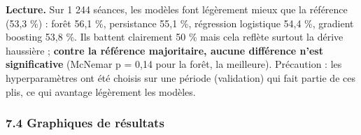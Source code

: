 \documentclass[
  10pt,
]{article}
\begin{document}
\textbf{Lecture.} Sur 1 244 séances, les modèles font légèrement mieux
que la référence (53,3 \%) : forêt 56,1 \%, persistance 55,1 \%,
régression logistique 54,4 \%, gradient boosting 53,8 \%. Ils battent
clairement 50 \% mais cela reflète surtout la dérive haussière ;
\textbf{contre la référence majoritaire, aucune différence n'est
significative} (McNemar p = 0,14 pour la forêt, la meilleure).
Précaution : les hyperparamètres ont été choisis sur une période
(validation) qui fait partie de ces plis, ce qui avantage légèrement les
modèles.

\hypertarget{graphiques-de-ruxe9sultats}{%
\subsubsection{7.4 Graphiques de
résultats}\label{graphiques-de-ruxe9sultats}}
\end{document}
